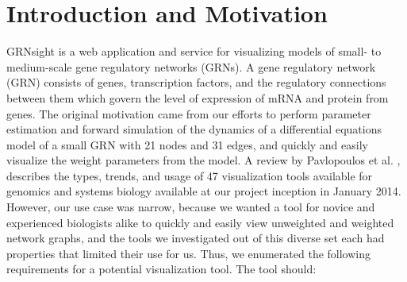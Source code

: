 \documentclass[sigconf,review,anonymous]{acmart}
\begin{document}





\maketitle

\section{Introduction and Motivation}

GRNsight is a web application and service for visualizing models of small- to medium-scale gene regulatory networks (GRNs). A gene regulatory network (GRN) consists of genes, transcription factors, and the regulatory connections between them which govern the level of expression of mRNA and protein from genes. The original motivation came from our efforts to perform parameter estimation and forward simulation of the dynamics of a differential equations model of a small GRN with 21 nodes and 31 edges, and quickly and easily visualize the weight parameters from the model. A review by Pavlopoulos et al. \cite{doi:10.1186/s13742-015-0077-2}, describes the types, trends, and usage of 47 visualization tools available for genomics and systems biology available at our project inception in January 2014. However, our use case was narrow, because we wanted a tool for novice and experienced biologists alike to quickly and easily view unweighted and weighted network graphs, and the tools we investigated out of this diverse set each had properties that limited their use for us. Thus, we enumerated the following requirements for a potential visualization tool. The tool should:
\end{document}
